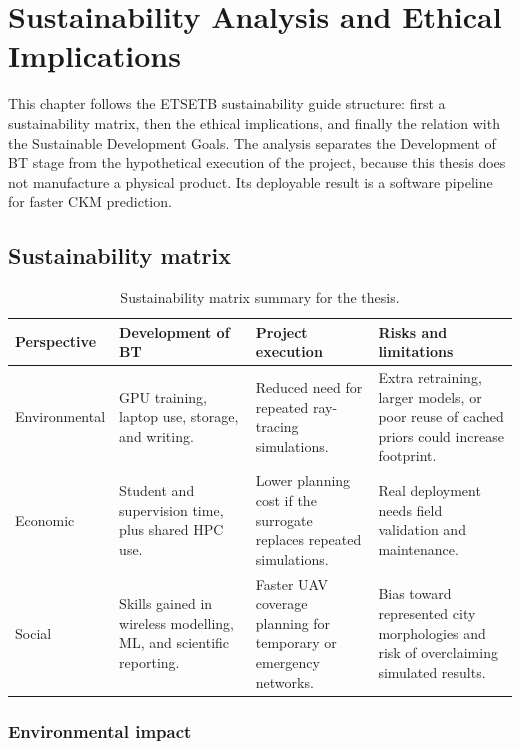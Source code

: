 \chapter{Sustainability Analysis and Ethical Implications}

This chapter follows the ETSETB sustainability guide structure: first a
sustainability matrix, then the ethical implications, and finally the relation
with the Sustainable Development Goals. The analysis separates the Development
of BT stage from the hypothetical execution of the project, because this thesis
does not manufacture a physical product. Its deployable result is a software
pipeline for faster CKM prediction.

\section{Sustainability matrix}

\begin{table}[ht]
\centering
\caption{Sustainability matrix summary for the thesis.}
\label{tab:sustainability_matrix}
\begin{tabularx}{\textwidth}{lXXX}
\toprule
Perspective & Development of BT & Project execution & Risks and limitations \\
\midrule
Environmental &
GPU training, laptop use, storage, and writing. &
Reduced need for repeated ray-tracing simulations. &
Extra retraining, larger models, or poor reuse of cached priors could increase footprint. \\
Economic &
Student and supervision time, plus shared HPC use. &
Lower planning cost if the surrogate replaces repeated simulations. &
Real deployment needs field validation and maintenance. \\
Social &
Skills gained in wireless modelling, ML, and scientific reporting. &
Faster UAV coverage planning for temporary or emergency networks. &
Bias toward represented city morphologies and risk of overclaiming simulated results. \\
\bottomrule
\end{tabularx}
\end{table}

\subsection{Environmental impact}

